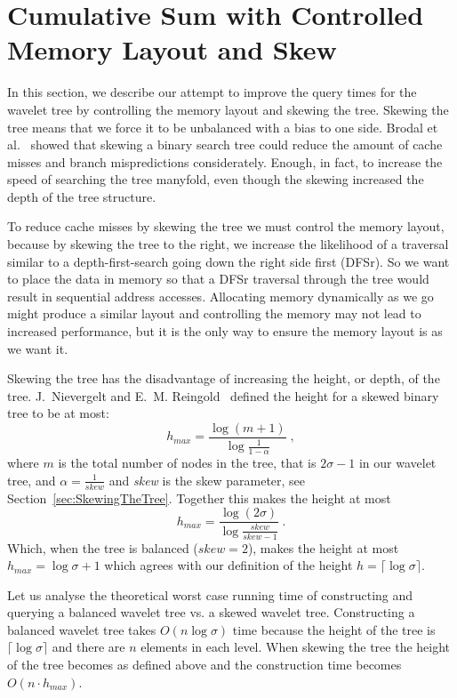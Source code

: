 \section{Cumulative Sum with Controlled Memory Layout and Skew}
\label{sec:memorylayout}
In this section, we describe our attempt to improve the query times for the wavelet tree by controlling the memory layout and skewing the tree.
Skewing the tree means that we force it to be unbalanced with a bias to one side. 
Brodal et al.~ showed that skewing a binary search tree could reduce the amount of cache misses and branch mispredictions considerately. Enough, in fact, to increase the speed of searching the tree manyfold, even though the skewing increased the depth of the tree structure.

To reduce cache misses by skewing the tree we must control the memory layout, because by skewing the tree to the right, we increase the likelihood of a traversal similar to a depth-first-search going down the right side first (DFSr). So we want to place the data in memory so that a DFSr traversal through the tree would result in sequential address accesses.
Allocating memory dynamically as we go might produce a similar layout and controlling the memory may not lead to increased performance, but it is the only way to ensure the memory layout is as we want it.

Skewing the tree has the disadvantage of increasing the height, or depth, of the tree.
J.~Nievergelt and E.~M. Reingold~ defined the height for a skewed binary tree to be at most:
\[ h_{max} = \frac{\log(m+1)}{ \log\frac{1}{1-\alpha}} \;,\]
where $m$ is the total number of nodes in the tree, that is $2 \sigma - 1$ in our wavelet tree, and $\alpha = \frac{1}{\mathit{skew}}$ and \textit{skew} is the skew parameter, see Section~\ref{sec:SkewingTheTree}.
Together this makes the height at most
\[ h_{max} = \frac{\log(2 \sigma)}{ \log\frac{\mathit{skew}}{\mathit{skew} - 1}}  \;.\]
Which, when the tree is balanced ($\mathit{skew} = 2$), makes the height at most $h_{max} = \log \sigma + 1$ which agrees with our definition of the height $h = \lceil \log \sigma \rceil$.

Let us analyse the theoretical worst case running time of constructing and querying a balanced wavelet tree vs. a skewed wavelet tree.
Constructing a balanced wavelet tree takes  $O(n \log \sigma)$ time because the height of the tree is $\lceil \log \sigma \rceil$ and there are $n$ elements in each level.
When skewing the tree the height of the tree becomes as defined above and the construction time becomes $O(n \cdot h_{max})$.


